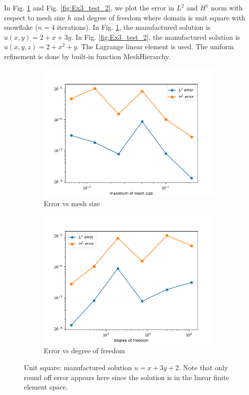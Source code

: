 \documentclass[12pt]{article}%
\theoremstyle{plain}
\numberwithin{equation}{section}
\begin{document}
In Fig. \ref{fig:Ex3_test} and Fig.  \ref{fig:Ex3_test_2}, we plot the error in $L^2$ and $H^1$ norm with respect to mesh size $h$ and degree of freedom where domain is unit square with snowflake ($n=4$ iterations). In Fig. \ref{fig:Ex3_test}, the manufactured solution is $u(x,y)= 2+x+3y$. In Fig. \ref{fig:Ex3_test_2}, the manufactured solution is $u(x,y,z)= 2+x^2+y$. The Lagrange linear element is used. The uniform refinement is done by built-in function MeshHierarchy.

\begin{figure}[H]%
    \centering
         \begin{subfigure}[h]{0.45\linewidth}
          \caption{Error vs mesh size}
\includegraphics[width=\linewidth]{figures/Ex3/Ex3_test1.png}
\end{subfigure}
  \begin{subfigure}[h]{0.45\linewidth}
   \caption{Error vs degree of freedom}
\includegraphics[width=\linewidth]{figures/Ex3/Ex3_test1_dof.png}
\end{subfigure}
  \caption{Unit square: manufactured solution $u=x+3y+2$. Note that only round off error appears here since the solution is in the linear finite element space.}
  \label{fig:Ex3_test}
 \end{figure}
\end{document}

